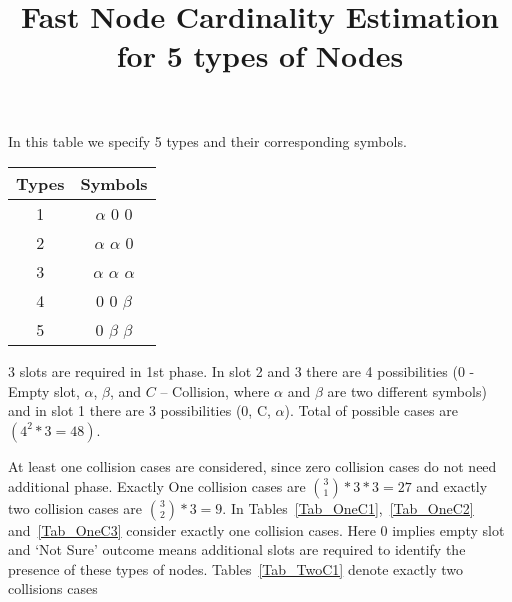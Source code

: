 \documentclass[fleqn]{article}
\begin{document}
\title{Fast Node Cardinality Estimation for 5 types of Nodes}

\maketitle{}

In this table we specify 5 types and their corresponding symbols. 
\begin{center}
  \begin{tabular}{| c | c |}
    \hline
    Types & Symbols \\ \hline
    1 & $\alpha$ $0$ $0$ \\ \hline
    2 & $\alpha$ $\alpha$ $0$ \\ \hline
    3 & $\alpha$ $\alpha$ $\alpha$ \\ \hline
    
    4 & $0$ $0$ $\beta$ \\ \hline
    5 & $0$ $\beta$ $\beta$ \\ \hline
    
    \hline
  \end{tabular}
\end{center}

3 slots are required in 1st phase. In slot 2 and 3 there are 4 possibilities (0 - Empty slot, $\alpha$, $\beta$, and $C$ – Collision, where $\alpha$ and $\beta$ are two different symbols) and in slot 1 there are 3 possibilities (0, C, $\alpha$). Total of possible cases are $(4^2*3 = 48)$. 
\par At least one collision cases are considered, since zero collision cases do not need additional phase. Exactly One collision cases are $\binom{3}{1}*3*3 = 27$ and exactly two collision cases are $\binom{3}{2}*3 = 9$. In Tables~\ref{Tab_OneC1},~\ref{Tab_OneC2} and~\ref{Tab_OneC3} consider exactly one collision cases. Here $0$ implies empty slot and `Not Sure' outcome means additional slots are required to identify the presence of these types of nodes. Tables~\ref{Tab_TwoC1} denote exactly two collisions cases
\end{document}
